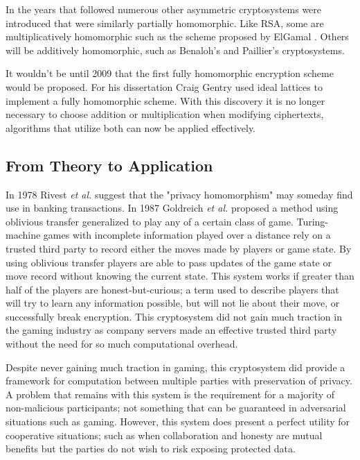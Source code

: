 \documentclass[]{article}
\begin{document}
In the years that followed numerous other asymmetric cryptosystems were introduced that were similarly partially homomorphic. 
Like RSA, some are multiplicatively homomorphic such as the scheme proposed by ElGamal \cite{Elgamal1985}.
Others will be additively homomorphic, such as Benaloh's \cite{Benaloh1994}
and Paillier's \cite{Paillier1999} cryptosystems.
	
It wouldn't be until 2009 that the first fully homomorphic encryption scheme would be proposed. 
For his dissertation \cite{Gentry2009} Craig Gentry used ideal lattices to implement a fully homomorphic scheme. 	
With this discovery it is no longer necessary to choose addition or multiplication when modifying ciphertexts,
algorithms that utilize both can now be applied effectively.
	
	\subsection{From Theory to Application}
	
In 1978 Rivest \emph{et al.} suggest that the "privacy homomorphism" may someday find use in banking transactions. \cite{Rivest1978-2} 
In 1987 Goldreich \emph{et al.} proposed a method using oblivious transfer \cite{Rabin1981} generalized to play any of a certain class of game. \cite{Goldreich1987}
Turing-machine games with incomplete information played over a distance rely on a trusted third party to record either the moves made by players or game state.
By using oblivious transfer players are able to pass updates of the game state or move record without knowing the current state.
This system works if greater than half of the players are honest-but-curious; 
a term used to describe players that will try to learn any information possible, but will not lie about their move, or successfully break encryption.
This cryptosystem did not gain much traction in the gaming industry as company servers made an effective trusted third party without the need for so much computational overhead.

Despite never gaining much traction in gaming, this cryptosystem did provide a framework for computation between multiple parties with preservation of privacy.
A problem that remains with this system is the requirement for a majority of non-malicious participants;
not something that can be guaranteed in adversarial situations such as gaming. 
However, this system does present a perfect utility for cooperative situations;
such as when collaboration and honesty are mutual benefits but the parties do not wish to risk exposing protected data.
	
\end{document}

